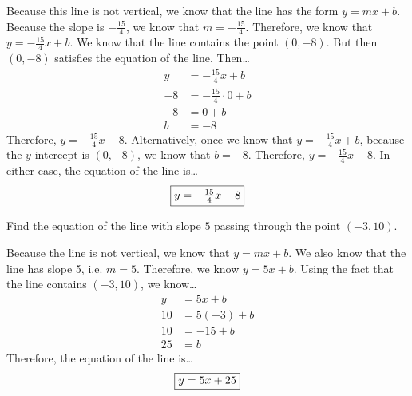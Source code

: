 \documentclass[11pt,letterpaper]{article}
\begin{document}
\sol Because this line is not vertical, we know that the line has the form $y= mx + b$. Because the slope is $-\frac{15}{4}$, we know that $m= -\frac{15}{4}$. Therefore, we know that $y= -\frac{15}{4}x + b$. We know that the line contains the point $(0, -8)$. But then $(0, -8)$ satisfies the equation of the line. Then\dots
	\[
	\begin{aligned}
	y&= -\frac{15}{4}x + b \\[0.3cm]
	-8&= -\frac{15}{4} \cdot 0 + b \\[0.3cm]
	-8&= 0 + b \\[0.3cm]
	b&= -8
	\end{aligned}
	\]
Therefore, $y= -\frac{15}{4}x - 8$. Alternatively, once we know that $y= -\frac{15}{4}x + b$, because the $y$-intercept is $(0, -8)$, we know that $b= -8$. Therefore, $y= -\frac{15}{4}x - 8$.  In either case, the equation of the line is\dots
	\[
	\framebox{$y= -\frac{15}{4}x - 8$}
	\]



\newpage



 Find the equation of the line with slope $5$ passing through the point $(-3, 10)$. \pspace

\sol Because the line is not vertical, we know that $y= mx + b$. We also know that the line has slope 5, i.e. $m= 5$. Therefore, we know $y= 5x + b$. Using the fact that the line contains $(-3, 10)$, we know\dots
	\[
	\begin{aligned}
	y&= 5x + b \\[0.3cm]
	10&= 5(-3) + b \\[0.3cm]
	10&= -15 + b \\[0.3cm]
	25&= b
	\end{aligned}
	\]
Therefore, the equation of the line is\dots
	\[
	\framebox{$y= 5x + 25$}
	\]
\end{document}
